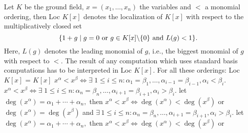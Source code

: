 Let $K$ be the ground field, \hbox{$x = (x_1, \ldots, x_n)$} the
variables and $<$ a monomial ordering, then Loc $K[x]$ denotes the
localization of $K[x]$ with respect to the multiplicatively closed set $$\{1 +
g \mid g = 0 \hbox{ or } g \in K[x]\backslash \{0\} \hbox{ and }L(g) <
1\}.$$   Here, $L(g)$ 
denotes the leading monomial of $g$, i.e., the biggest monomial of $g$ with
respect to $<$.   The result of any computation which uses standard basis
computations has to be interpreted in Loc $K[x]$.
For all these orderings: Loc $K[x]$ = $K[x]$
$x^\alpha < x^\beta  \Leftrightarrow  \exists\; 1 \le i \le n :
\alpha_1 = \beta_1, \ldots, \alpha_{i-1} = \beta_{i-1}, \alpha_i <
\beta_i$.
$x^\alpha < x^\beta  \Leftrightarrow  \exists\; 1 \le i \le n :
\alpha_n = \beta_n,
    \ldots, \alpha_{i+1} = \beta_{i+1}, \alpha_i > \beta_i.$
let $\deg(x^\alpha) = \alpha_1 + \cdots + \alpha_n,$ then
    $x^\alpha < x^\beta \Leftrightarrow \deg(x^\alpha) < \deg(x^\beta)$ or
    \phantom{$x^\alpha < x^\beta \Leftrightarrow $}$ \deg(x^\alpha) =
    \deg(x^\beta)$ and $\exists\ 1 \le i \le n: \alpha_n = \beta_n,
    \ldots, \alpha_{i+1} = \beta_{i+1}, \alpha_i > \beta_i.$
let $\deg(x^\alpha) = \alpha_1 + \cdots + \alpha_n,$ then
    $x^\alpha < x^\beta \Leftrightarrow \deg(x^\alpha) < \deg(x^\beta)$ or
